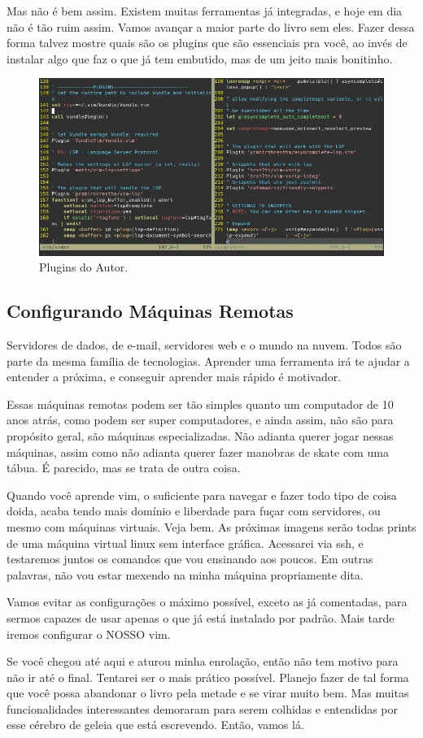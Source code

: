 Mas não é bem assim. Existem muitas ferramentas já integradas, e hoje em dia não é tão ruim assim.
Vamos avançar a maior parte do livro sem eles.
Fazer dessa forma talvez mostre quais são os plugins que são essenciais pra você,
ao invés de instalar algo que faz o que já tem embutido, mas de um jeito mais bonitinho.

\begin{figure}[!ht]
\centering
\includegraphics[scale=0.73]{motivacao/Plugin_Exemplo.jpg}
\caption{Plugins do Autor.}
\end{figure}

\subsection{Configurando Máquinas Remotas}
Servidores de dados, de e-mail, servidores web e o mundo na nuvem.
Todos são parte da mesma família de tecnologias.
Aprender uma ferramenta irá te ajudar a entender a próxima, e conseguir aprender mais rápido é motivador.

Essas máquinas remotas podem ser tão simples quanto um computador de 10 anos atrás,
como podem ser super computadores, e ainda assim, não são para propósito geral, são máquinas especializadas.
Não adianta querer jogar nessas máquinas, assim como não adianta querer fazer manobras de skate com uma tábua.
É parecido, mas se trata de outra coisa.

Quando você aprende vim, o suficiente para navegar e fazer todo tipo de coisa doida,
acaba tendo mais domínio e liberdade para fuçar com servidores, ou mesmo com máquinas virtuais.
Veja bem. As próximas imagens serão todas prints de uma máquina virtual linux sem interface gráfica.
Acessarei via ssh, e testaremos juntos os comandos que vou ensinando aos poucos.
Em outras palavras, não vou estar mexendo na minha máquina propriamente dita.

Vamos evitar as configurações o máximo possível, exceto as já comentadas, para sermos capazes de usar
apenas o que já está instalado por padrão.
Mais tarde iremos configurar o NOSSO vim.

Se você chegou até aqui e aturou minha enrolação, então não tem motivo para não ir até o final.
Tentarei ser o mais prático possível.
Planejo fazer de tal forma que você possa abandonar o livro pela metade e se virar muito bem.
Mas muitas funcionalidades interessantes demoraram para serem colhidas e entendidas por esse cérebro
de geleia que está escrevendo. Então, vamos lá.

\newpage
